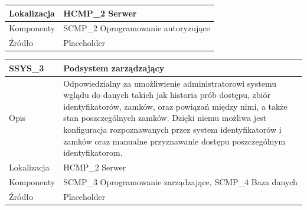 \begin{table}
\begin{subtable}[c]{\textwidth}
\begin{tabular}{|p{2cm}|p{12cm}|}
                            \hline \cellcolor[gray]{0.8} Lokalizacja  & HCMP\_2 Serwer    \\
                            \hline \cellcolor[gray]{0.8} Komponenty   & SCMP\_2 Oprogramowanie autoryzujące \\
                            \hline \cellcolor[gray]{0.8} Źródło       & Placeholder    \\
                            \hline
                        \end{tabular}
                        \label{tbl:ssys2}
                        \vspace{10mm}           
                    \end{subtable}
                \quad%
                    \begin{subtable}[c]{\textwidth}
                        \centering
                        \begin{tabular}{|p{2cm}|p{12cm}|}
                            \hline SSYS\_3      & \textbf{Podsystem zarządzający} \\
                            \hline \cellcolor[gray]{0.8} Opis         & Odpowiedzialny za umożliwienie administratorowi systemu wglądu do danych takich jak historia prób dostępu, zbiór identyfikatorów, zamków, oraz powiązań między nimi, a także stan poszczególnych zamków. Dzięki niemu możliwa jest konfiguracja rozpoznawanych przez system identyfikatorów i zamków oraz manualne przyznawanie dostępu poszczególnym identyfikatorom. \\
                            \hline \cellcolor[gray]{0.8} Lokalizacja  & HCMP\_2 Serwer    \\
                            \hline \cellcolor[gray]{0.8} Komponenty   & SCMP\_3 Oprogramowanie zarządzające, SCMP\_4 Baza danych \\
                            \hline \cellcolor[gray]{0.8} Źródło       & Placeholder    \\
                            \hline
                        \end{tabular}
                        \label{tbl:ssys3}      
                    \end{subtable}                 
                    \label{tbl:subsystems}
                \end{table}

